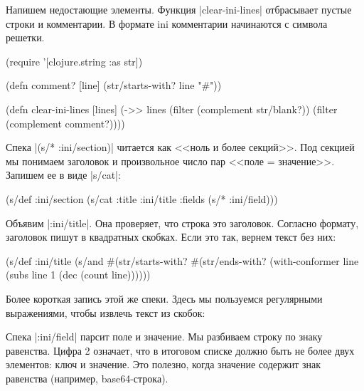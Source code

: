 Напишем недостающие элементы. Функция \spverb|clear-ini-lines| отбрасывает
пустые строки и комментарии. В формате ini комментарии начинаются с символа
решетки.

\begin{english}
  \begin{clojure}
(require '[clojure.string :as str])

(defn comment? [line]
  (str/starts-with? line "#"))

(defn clear-ini-lines [lines]
  (->> lines
       (filter (complement str/blank?))
       (filter (complement comment?))))
  \end{clojure}
\end{english}

Спека \spverb|(s/* :ini/section)| читается как <<ноль и более секций>>. Под
секцией мы понимаем заголовок и произвольное число пар <<поле =
значение>>. Запишем ее в виде \spverb|s/cat|:

\begin{english}
  \begin{clojure}
(s/def :ini/section
  (s/cat :title :ini/title :fields (s/* :ini/field)))
  \end{clojure}
\end{english}

Объявим \spverb|:ini/title|. Она проверяет, что строка это заголовок. Согласно
формату, заголовок пишут в квадратных скобках. Если это так, вернем текст без
них:

\begin{english}
  \begin{clojure}
(s/def :ini/title
  (s/and
   #(str/starts-with? %
   #(str/ends-with? %
   (with-conformer line
     (subs line 1 (dec (count line))))))
  \end{clojure}
\end{english}

Более короткая запись этой же спеки. Здесь мы пользуемся регулярными
выражениями, чтобы извлечь текст из скобок:

\begin{english}
\end{english}

Спека \spverb|:ini/field| парсит поле и значение. Мы разбиваем строку по знаку
равенства. Цифра 2 означает, что в итоговом списке должно быть не более двух
элементов: ключ и значение. Это полезно, когда значение содержит знак равенства
(например, base64-строка).

